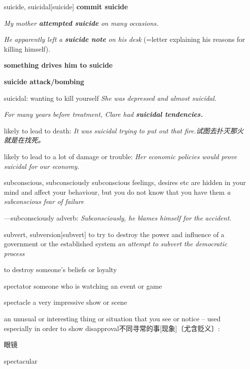 \begin{word}{suicide, suicidal}[suicide]
    \textbf{commit suicide}

    \textit{My mother \textbf{attempted suicide} on many occasions.}

    \textit{He apparently left a \textbf{suicide note} on his desk} (=letter explaining his reasons for killing himself).

    \textbf{something drives him to suicide}

    \textbf{suicide attack/bombing}

    suicidal: 
    wanting to kill yourself
    \textit{She was depressed and almost suicidal.}

    \textit{For many years before treatment, Clare had \textbf{suicidal tendencies.}}

    likely to lead to death:
    \textit{It was suicidal trying to put out that fire.试图去扑灭那火就是在找死。}

    likely to lead to a lot of damage or trouble: 
    \textit{Her economic policies would prove suicidal for our economy.}
\end{word}

\begin{word}{subconscious, subconsciously}
    subconscious feelings, desires etc are hidden in your mind and affect your behaviour, but you do not know that you have them
    \textit{a subconscious fear of failure}

    —subconsciously adverb:
    \textit{Subconsciously, he blames himself for the accident.}
\end{word}

\begin{word}{subvert, subversion}[subvert]
    to try to destroy the power and influence of a government or the established system
    \textit{an attempt to subvert the democratic process}

    to destroy someone’s beliefs or loyalty
\end{word}

\begin{word}{spectator}
    someone who is watching an event or game


\end{word}

\begin{word}{spectacle}
    a very impressive show or scene

    an unusual or interesting thing or situation that you see or notice – used especially in order to show disapproval不同寻常的事[现象]〔尤含贬义〕:

    眼镜
\end{word}

\begin{word}{spectacular}
\end{word}